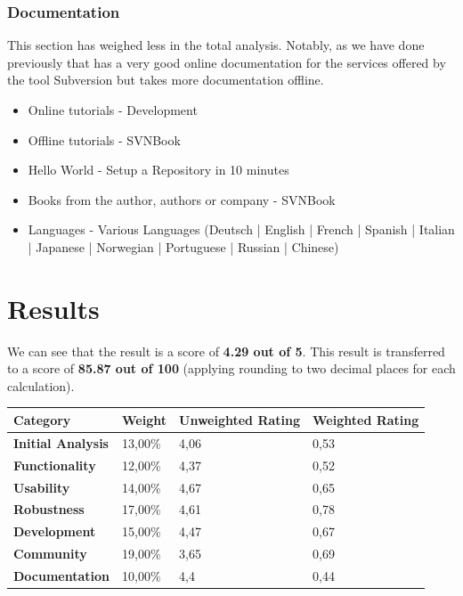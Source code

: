 \documentclass[11pt]{scrartcl}
\begin{document}
\subsubsection{Documentation}

\par This section has weighed less in the total analysis. Notably, as we have done previously that has a very good online documentation for the services offered by the tool Subversion but takes more documentation offline.

\begin{itemize}
    \item Online tutorials - Development
    \item Offline tutorials - SVNBook
    \item Hello World - Setup a Repository in 10 minutes
    \item Books from the author, authors or company - SVNBook
    \item Languages - Various Languages (Deutsch | English | French | Spanish | Italian | Japanese | Norwegian | Portuguese | Russian | Chinese)
\end{itemize}

\section{Results}

We can see that the result is a score of \textbf{4.29 out of 5}. This result is transferred to a score of \textbf{85.87 out of 100} (applying rounding to two decimal places for each calculation).

\begin{tabular}{|l|l|l|l|}
    \hline {\bf Category} & {\bf Weight} & {\bf Unweighted Rating} & {\bf Weighted Rating}\\
    \hline {\bf Initial Analysis}	 & 13,00\% & 4,06 & 0,53 \\
    \hline {\bf Functionality} & 12,00\% & 4,37 & 0,52\\
    \hline {\bf Usability} & 14,00\% & 4,67 & 0,65\\
    \hline {\bf Robustness} & 17,00\% & 4,61 & 0,78\\
    \hline {\bf Development} & 15,00\% & 4,47 & 0,67\\
    \hline {\bf Community} & 19,00\% & 3,65 & 0,69\\
    \hline {\bf Documentation} & 10,00\% & 4,4 & 0,44\\
    \hline
\end{tabular}
\end{document}
